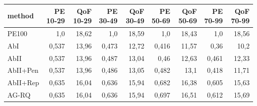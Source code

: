 \begin{tabular}{lrrrrrrrr}
\toprule
method & PE 10-29 & QoF 10-29 & PE 30-49 & QoF 30-49 & PE 50-69 & QoF 50-69 & PE 70-99 & QoF 70-99 \\
\midrule
PE100 & 1{,}0 & 18{,}62 & 1{,}0 & 18{,}59 & 1{,}0 & 18{,}43 & 1{,}0 & 18{,}56 \\
AbI & 0{,}537 & 13{,}96 & 0{,}473 & 12{,}72 & 0{,}416 & 11{,}57 & 0{,}36 & 10{,}2 \\
AbII & 0{,}537 & 13{,}96 & 0{,}487 & 13{,}04 & 0{,}46 & 12{,}63 & 0{,}461 & 12{,}33 \\
AbII+Pen & 0{,}537 & 13{,}96 & 0{,}486 & 13{,}05 & 0{,}482 & 13{,}1 & 0{,}418 & 11{,}71 \\
AbII+Rep & 0{,}635 & 16{,}04 & 0{,}636 & 15{,}94 & 0{,}682 & 16{,}38 & 0{,}605 & 15{,}63 \\
AG-RQ & 0{,}635 & 16{,}04 & 0{,}636 & 15{,}94 & 0{,}697 & 16{,}51 & 0{,}612 & 15{,}69 \\
\bottomrule
\end{tabular}
